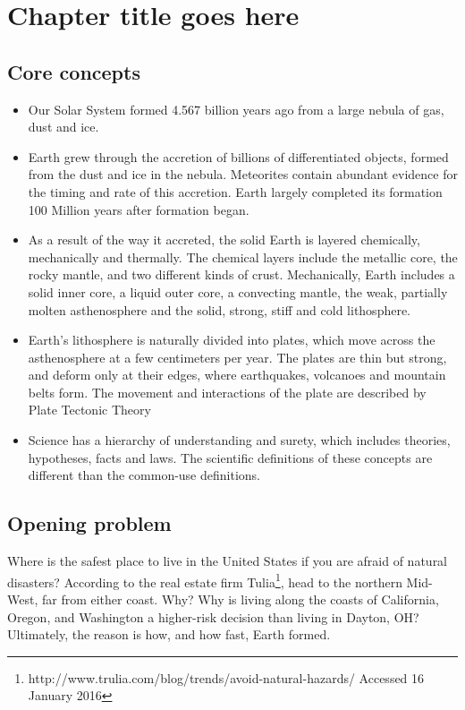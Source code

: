 
\chapter{Chapter title goes here}\label{chap:geosph}

\section{Core concepts}
\begin{itemize}
\item Our Solar System formed 4.567 billion years ago from a large nebula of gas, dust and ice. 
\item Earth grew through the accretion of billions of differentiated objects, formed from the dust and ice in the nebula. Meteorites contain abundant evidence for the timing and rate of this accretion. Earth largely completed its formation 100 Million years after formation began. 
\item As a result of the way it accreted, the solid Earth is layered chemically, mechanically and thermally. The chemical layers include the metallic core, the rocky mantle, and two different kinds of crust. Mechanically, Earth includes a solid inner core, a liquid outer core, a convecting mantle, the weak, partially molten asthenosphere and the solid, strong, stiff and cold lithosphere.
\item Earth's lithosphere is naturally divided into plates, which move across the asthenosphere at a few centimeters per year. The plates are thin but strong, and deform only at their edges, where earthquakes, volcanoes and mountain belts form. The movement and interactions of the plate are described by Plate Tectonic Theory
\item Science has a hierarchy of understanding and surety, which includes theories, hypotheses, facts and laws. The scientific definitions of these concepts are different than the common-use definitions. 
\end{itemize}

\section{Opening problem}
Where is the safest place to live in the United States if you are afraid of natural disasters? According to the real estate firm Tulia\footnote{http://www.trulia.com/blog/trends/avoid-natural-hazards/ Accessed 16 January 2016}, head to the northern Mid-West, far from either coast. Why? Why is living along the coasts of California, Oregon, and Washington a higher-risk decision than living in Dayton, OH? Ultimately, the reason is how, and how fast, Earth formed. 

